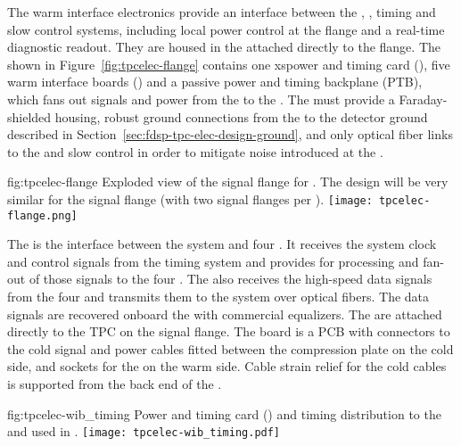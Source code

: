 The warm interface electronics %
provide an interface between the , , timing and slow control systems, including local power control at the flange and a real-time diagnostic readout. They are housed in the  attached directly to the  flange.  The  shown in Figure~\ref{fig:tpcelec-flange} 
contains one xspower and timing card (), five warm interface boards () and a passive
power and timing backplane (PTB), which fans out signals and  power from the  to the . The  must provide a Faraday-shielded housing, robust ground connections from the  to the detector ground described in Section~\ref{sec:fdsp-tpc-elec-design-ground}, and only optical fiber links to the  and slow control in order to mitigate noise introduced at the  \fdth.

\begin{dunefigure}
{fig:tpcelec-flange}
{Exploded view of the  signal flange for .  The design will be very similar for the   signal flange (with two  signal flanges per \fdth).}
\texttt{[image: tpcelec-flange.png]}
\end{dunefigure}

The  is the interface between the  system and four
. It receives the system clock and control signals from the
timing system and provides for processing and fan-out of those signals to the four
. The  also receives the high-speed data signals from the four 
 and transmits them to the  system over optical
fibers. The data signals are recovered onboard the  with commercial equalizers.
The  are attached directly to the TPC
 \fdth on the signal flange. The \fdth
board is a PCB with connectors to the cold signal and  power cables fitted
between the compression plate on the cold side, and sockets for
the  on the warm side. Cable strain relief for the cold cables is 
supported from the back end of the \fdth.

\begin{dunefigure}
{fig:tpcelec-wib_timing}
{Power and timing card () and timing distribution to the  and  used in .}
\texttt{[image: tpcelec-wib\_timing.pdf]}
\end{dunefigure}

